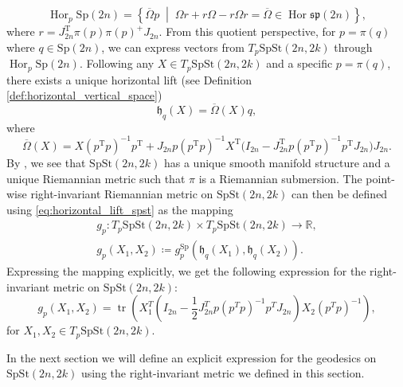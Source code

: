 %
\begin{equation*}
\operatorname{Hor}_{p}\mathrm{Sp}(2n)=\left\{ \overline{\Omega}p\;\middle|\;\Omega r+r\Omega-r\Omega r=\overline{\Omega}\in \operatorname{Hor}\mathfrak{sp}(2n) \right\},
\end{equation*}
%
where $r=J_{2n}^{\mathrm{T}}\pi(p)\pi (p)^+J_{2n}$. From this quotient perspective, for $p=\pi(q)$ where $q\in \mathrm{Sp}(2n)$, we can express vectors from $T_{p}\mathrm{SpSt}(2n, 2k)$ through $\operatorname{Hor}_{p}\mathrm{Sp}(2n)$. Following \cite[p.~5]{JensenZimmermann2024} any $X\in T_{p}\mathrm{SpSt}(2n, 2k)$ and a specific $p=\pi (q)$, there exists a unique horizontal lift (see Definition \ref{def:horizontal_vertical_space})
%
\begin{equation}\label{eq:horizontal_lift_spst}
    \mathfrak{h}_{q}(X)=\overline{\Omega}(X)q,
\end{equation}
where
\begin{equation}\label{eq:bar_omega}
    \overline{\Omega}(X)=X(p^{\mathrm{T}}p)^{-1}p^{\mathrm{T}}+J_{2n}p(p^{\mathrm{T}}p)^{-1}X^{\mathrm{T}}\big(I_{2n}-J_{2n}^{\mathrm{T}}p(p^{\mathrm{T}}p)^{-1}p^{\mathrm{T}}J_{2n}\big)J_{2n}.
\end{equation}
%
By \cite[Thm.~2.28]{Lee2018}, we see that $\mathrm{SpSt}(2n, 2k)$ has a unique smooth manifold structure and a unique Riemannian metric such that $\pi$ is a Riemannian submersion. The point-wise right-invariant Riemannian metric on $\mathrm{SpSt}(2n, 2k)$ can then be defined using \eqref{eq:horizontal_lift_spst} as the mapping 
%
\begin{equation*}
    \begin{gathered}
        g_{p}\colon T_{p}\mathrm{SpSt}(2n, 2k)\times T_{p}\mathrm{SpSt}(2n, 2k)\xrightarrow{}\mathbb{R}, \\
        g_{p}(X_{1},X_{2})\coloneqq g^{\mathrm{Sp}}_{p}(\mathfrak{h}_{q}(X_{1}),\mathfrak{h}_{q}(X_{2})).
    \end{gathered}
\end{equation*}
%
Expressing the mapping explicitly, we get the following expression for the right-invariant metric on $\mathrm{SpSt}(2n, 2k)$:
\begin{equation}\label{eq:spst_metric}
    g_{p}(X_{1},X_{2})=\operatorname{tr}\left(X_{1}^{T}\left(I_{2n}- \frac{1}{2}J_{2n}^{T}p(p^{T}p)^{-1}p^{T}J_{2n}\right)X_{2}(p^{T}p)^{-1}\right),
\end{equation}
for $X_{1},X_{2}\in T_{p}\mathrm{SpSt}(2n, 2k)$.

In the next section we will define an explicit expression for the geodesics on $\mathrm{SpSt}(2n, 2k)$ using the right-invariant metric we defined in this section. 



